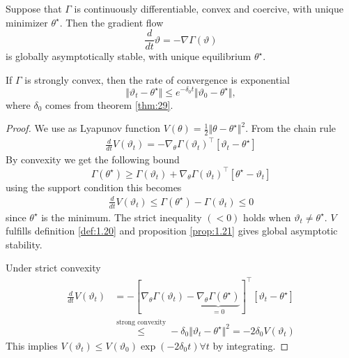 \begin{proposition}\label{prop:30}
    Suppose that \(\Gamma\) is continuously differentiable, convex and coercive,
    with unique minimizer \(\theta^\star\). Then the gradient flow 
    \[\frac{d}{dt}\vartheta=-\nabla\Gamma(\vartheta)\]
    is globally asymptotically stable, with unique equilibrium
    \(\theta^\star\). 
    
    If \(\Gamma\) is strongly convex, then the rate of convergence is exponential
    \[\Vert \vartheta_t-\theta^\star\Vert\leq e^{-\delta_0 t}\Vert \vartheta_0-\theta^\star\Vert,\]
    where \(\delta_0\) comes from theorem \ref{thm:29}.
\end{proposition}
\begin{proof}
    We use as Lyapunov function \(V(\theta)=\frac{1}{2}\Vert \theta-\theta^\star\Vert^2\). From the chain rule
    \begin{align*}
        \frac{d}{dt}V(\vartheta_t)=-\nabla_\theta\Gamma(\vartheta_t)^\intercal\left[\vartheta_t-\theta^\star\right]
    \end{align*}
    By convexity we get the following bound 
    \[\Gamma(\theta^\star)\geq \Gamma(\vartheta_t)+\nabla_\theta\Gamma(\vartheta_t)^\intercal\left[\theta^\star-\vartheta_t\right]\]
    using the support condition this becomes 
    \begin{align*}
        \frac{d}{dt}V(\vartheta_t)\leq \Gamma(\theta^\star)-\Gamma(\vartheta_t)\leq 0
    \end{align*}
    since \(\theta^\star\) is the minimum. The strict inequality \((<0)\) holds when \(\vartheta_t\neq \theta^\star\).
    \(V\) fulfills definition \ref{def:1.20} and proposition \ref{prop:1.21} gives 
    global asymptotic stability. 

    Under strict convexity 
    \begin{align*}
            \frac{d}{dt}V(\vartheta_t)&=-\left[\nabla_\theta \Gamma(\vartheta_t)-\underbrace{\nabla_\theta\Gamma(\theta^\star)}_{=0}\right]^\intercal \left[\vartheta_t-\theta^\star\right]\\
            &\stackrel{\text{strong convexity}}{\leq} -\delta_0 \Vert \vartheta_t-\theta^\star\Vert^2=-2\delta_0V(\vartheta_t)
    \end{align*}
    This implies \(V(\vartheta_t)\leq V(\vartheta_0)\exp(-2\delta_0t) \forall t\) by integrating.
\end{proof}

